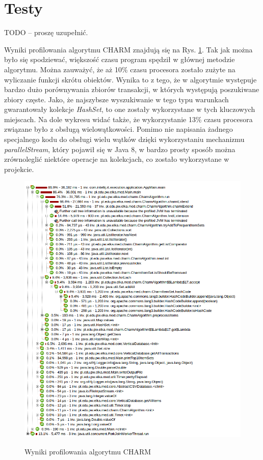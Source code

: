 \section{Testy}

TODO -- proszę uzupełnić.

Wyniki profilowania algorytmu CHARM znajdują się na Rys. \ref{charm:profil}. Tak jak można było się spodziewać, większość czasu program spędził w głównej metodzie algorytmu. Można zauważyć, że aż 10\% czasu procesora zostało zużyte na wyliczanie funkcji skrótu obiektów. Wynika to z tego, że w algorytmie występuje bardzo dużo porównywania zbiorów transakcji, w których występują poszukiwane zbiory częste. Jako, że najszybsze wyszukiwanie w tego typu warunkach gwarantowały kolekcje \emph{HashSet}, to one zostały wykorzystane w tych kluczowych miejscach. Na dole wykresu widać także, że wykorzystanie 13\% czasu procesora związane było z obsługą wielowątkowości. Pomimo nie napisania żadnego specjalnego kodu do obsługi wielu wątków dzięki wykorzystaniu mechanizmu \emph{parallelStream}, który pojawił się w Java 8, w bardzo prosty sposób można zrównoleglić niektóre operacje na kolekcjach, co zostało wykorzystane w projekcie.

\begin{figure}
\caption{Wyniki profilowania algorytmu CHARM}
\includegraphics[width=17cm]{res/charm-profi.png}
\label{charm:profil}
\end{figure}
